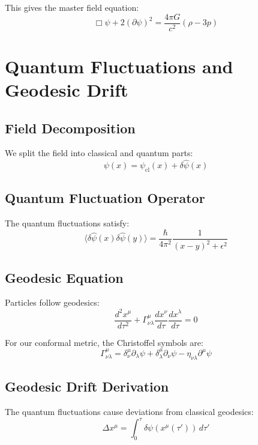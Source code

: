 \documentclass[11pt]{article}
\begin{document}
This gives the master field equation:
\begin{equation}
\boxed{\Box\psi + 2(\partial\psi)^2 = \frac{4\pi G}{c^2}(\rho - 3p)}
\end{equation}

\section{Quantum Fluctuations and Geodesic Drift}

\subsection{Field Decomposition}
We split the field into classical and quantum parts:
\begin{equation}
\psi(x) = \psi_{\text{cl}}(x) + \delta\hat{\psi}(x)
\end{equation}

\subsection{Quantum Fluctuation Operator}
The quantum fluctuations satisfy:
\begin{equation}
\langle \delta\hat{\psi}(x)\delta\hat{\psi}(y)\rangle = \frac{\hbar}{4\pi^2}\frac{1}{(x-y)^2+\epsilon^2}
\end{equation}

\subsection{Geodesic Equation}
Particles follow geodesics:
\begin{equation}
\frac{d^2x^\mu}{d\tau^2} + \Gamma^\mu_{\nu\lambda}\frac{dx^\nu}{d\tau}\frac{dx^\lambda}{d\tau} = 0
\end{equation}

For our conformal metric, the Christoffel symbols are:
\begin{equation}
\Gamma^\mu_{\nu\lambda} = \delta^\mu_\nu\partial_\lambda\psi + \delta^\mu_\lambda\partial_\nu\psi - \eta_{\nu\lambda}\partial^\mu\psi
\end{equation}

\subsection{Geodesic Drift Derivation}
The quantum fluctuations cause deviations from classical geodesics:
\begin{equation}
\Delta x^\mu = \int_0^\tau \delta\psi(x^\mu(\tau')) \, d\tau'
\end{equation}
\end{document}

